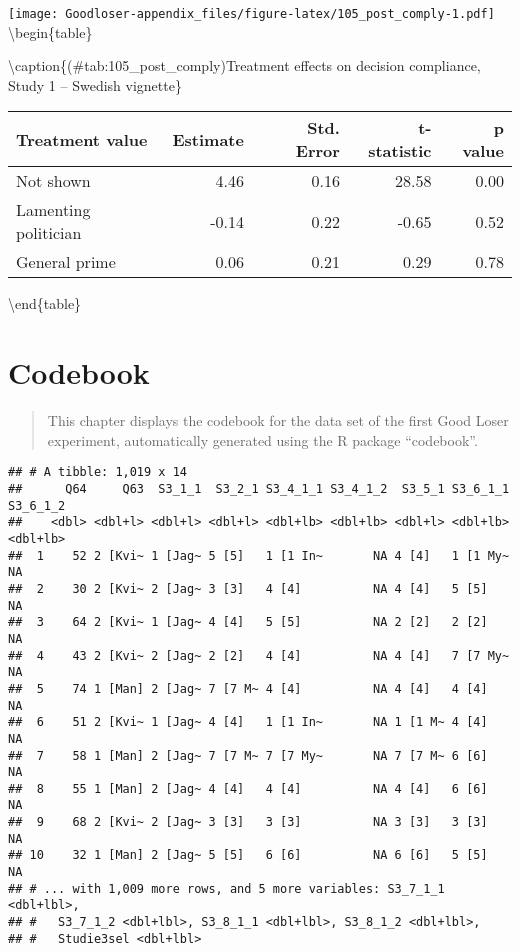 \documentclass[
]{book}
\begin{document}
\texttt{[image: Goodloser-appendix\_files/figure-latex/105\_post\_comply-1.pdf]} \textbackslash begin\{table\}

\textbackslash caption\{(\#tab:105\_post\_comply)Treatment effects on decision compliance, Study 1 -- Swedish vignette\}
\centering

\begin{tabular}[t]{lrrrr}
\toprule
Treatment value & Estimate & Std. Error & t-statistic & p value\\
\midrule
Not shown & 4.46 & 0.16 & 28.58 & 0.00\\
Lamenting politician & -0.14 & 0.22 & -0.65 & 0.52\\
General prime & 0.06 & 0.21 & 0.29 & 0.78\\
\bottomrule
\end{tabular}

\textbackslash end\{table\}

\hypertarget{codebook}{%
\chapter{Codebook}\label{codebook}}

\begin{quote}
This chapter displays the codebook for the data set of the first Good Loser experiment, automatically generated using the R package ``codebook''.
\end{quote}

\begin{verbatim}
## # A tibble: 1,019 x 14
##      Q64     Q63  S3_1_1  S3_2_1 S3_4_1_1 S3_4_1_2  S3_5_1 S3_6_1_1 S3_6_1_2
##    <dbl> <dbl+l> <dbl+l> <dbl+l> <dbl+lb> <dbl+lb> <dbl+l> <dbl+lb> <dbl+lb>
##  1    52 2 [Kvi~ 1 [Jag~ 5 [5]   1 [1 In~       NA 4 [4]   1 [1 My~       NA
##  2    30 2 [Kvi~ 2 [Jag~ 3 [3]   4 [4]          NA 4 [4]   5 [5]          NA
##  3    64 2 [Kvi~ 1 [Jag~ 4 [4]   5 [5]          NA 2 [2]   2 [2]          NA
##  4    43 2 [Kvi~ 2 [Jag~ 2 [2]   4 [4]          NA 4 [4]   7 [7 My~       NA
##  5    74 1 [Man] 2 [Jag~ 7 [7 M~ 4 [4]          NA 4 [4]   4 [4]          NA
##  6    51 2 [Kvi~ 1 [Jag~ 4 [4]   1 [1 In~       NA 1 [1 M~ 4 [4]          NA
##  7    58 1 [Man] 2 [Jag~ 7 [7 M~ 7 [7 My~       NA 7 [7 M~ 6 [6]          NA
##  8    55 1 [Man] 2 [Jag~ 4 [4]   4 [4]          NA 4 [4]   6 [6]          NA
##  9    68 2 [Kvi~ 2 [Jag~ 3 [3]   3 [3]          NA 3 [3]   3 [3]          NA
## 10    32 1 [Man] 2 [Jag~ 5 [5]   6 [6]          NA 6 [6]   5 [5]          NA
## # ... with 1,009 more rows, and 5 more variables: S3_7_1_1 <dbl+lbl>,
## #   S3_7_1_2 <dbl+lbl>, S3_8_1_1 <dbl+lbl>, S3_8_1_2 <dbl+lbl>,
## #   Studie3sel <dbl+lbl>
\end{verbatim}
\end{document}
